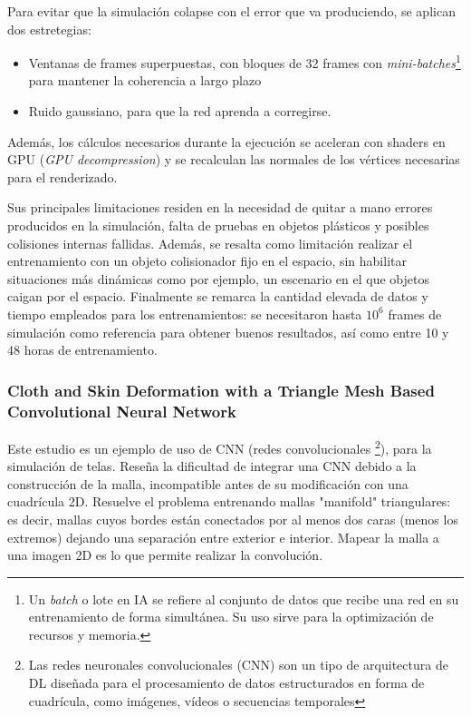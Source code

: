 Para evitar que la simulación colapse con el error que va produciendo, se aplican dos estretegias: 
\begin{itemize}
  \item Ventanas de frames superpuestas, con bloques de 32 frames con \textit{mini-batches}\footnote{Un \textit{batch} o lote en IA se refiere al conjunto de datos que recibe una red en su entrenamiento de forma simultánea. Su uso sirve para la optimización de recursos y memoria. } para mantener la coherencia a largo plazo
  \item Ruido gaussiano, para que la red aprenda a corregirse.
\end{itemize}
Además, los cálculos necesarios durante la ejecución se aceleran con shaders en GPU (\textit{GPU decompression}) y se recalculan las normales de los vértices necesarias para el renderizado. \newline

Sus principales limitaciones residen en la necesidad de quitar a mano errores producidos en la simulación, falta de pruebas en objetos plásticos y posibles colisiones internas fallidas. Además, se resalta como limitación realizar el entrenamiento con un objeto colisionador fijo en el espacio, sin habilitar situaciones más dinámicas como por ejemplo, un escenario en el que objetos caigan por el espacio. Finalmente se remarca la cantidad elevada de datos y tiempo empleados para los entrenamientos: se necesitaron hasta $10^{6}$ frames de simulación como referencia para obtener buenos resultados, así como entre 10 y 48 horas de entrenamiento.\newline

\subsubsection{Cloth and Skin Deformation with a Triangle Mesh Based Convolutional Neural Network}

Este estudio \cite{chentanez_cloth_2020} es un ejemplo de uso de CNN (redes convolucionales \footnote{Las redes neuronales convolucionales (CNN) son un tipo de arquitectura de DL diseñada para el procesamiento de datos estructurados en forma de cuadrícula, como imágenes, vídeos o secuencias temporales}), para la simulación de telas. Reseña la dificultad de integrar una CNN debido a la construcción de la malla, incompatible antes de su modificación con una cuadrícula 2D. Resuelve el problema entrenando mallas "manifold" triangulares: es decir, mallas cuyos bordes están conectados por al menos dos caras (menos los extremos) dejando una separación entre exterior e interior. Mapear la malla a una imagen 2D es lo que permite realizar la convolución. \newline


